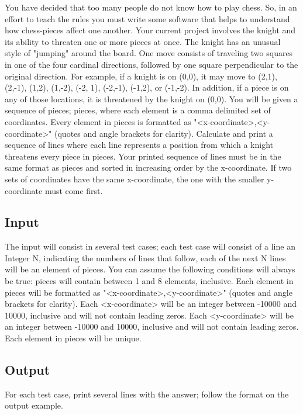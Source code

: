 You have decided that too many people do not know how to play chess. So, in an effort to teach the rules you must write some software that helps to understand how chess-pieces affect one another. Your current project involves the knight and its ability to threaten one or more pieces at once. The knight has an unusual style of "jumping" around the board. One move consists of traveling two squares in one of the four cardinal directions, followed by one square perpendicular to the original direction. For example, if a knight is on (0,0), it may move to (2,1), (2,-1), (1,2), (1,-2), (-2, 1), (-2,-1), (-1,2), or (-1,-2). In addition, if a piece is on any of those locations, it is threatened by the knight on (0,0).
You will be given a sequence of pieces; pieces, where each element is a comma delimited set of coordinates. Every element in pieces is formatted as "<x-coordinate>,<y-coordinate>" (quotes and angle brackets for clarity). Calculate and print a sequence of lines where each line represents a position from which a knight threatens every piece in pieces. Your printed sequence of lines must be in the same format as pieces and sorted in increasing order by the x-coordinate. If two sets of coordinates have the same x-coordinate, the one with the smaller y-coordinate must come first.

\subsection* {Input}

The input will consist in several test cases; each test case will consist of a line an Integer N, indicating the numbers of lines that follow, each of the next N lines will be an element of pieces. You can assume the following conditions will always be true:
pieces will contain between 1 and 8 elements, inclusive.
Each element in pieces will be formatted as "<x-coordinate>,<y-coordinate>" (quotes and angle brackets for clarity).
Each <x-coordinate> will be an integer between -10000 and 10000, inclusive and will not contain leading zeros.
Each <y-coordinate> will be an integer between -10000 and 10000, inclusive and will not contain leading zeros.
Each element in pieces will be unique.

\subsection* {Output}

For each test case, print several lines with the answer; follow the format on the output example.

